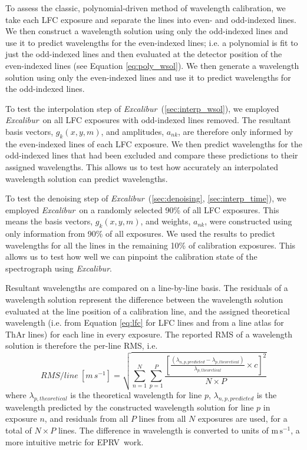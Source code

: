 \documentclass[modern]{aastex63}
\newcommand{\project}[1]{\textsl{#1}}
\newcommand{\name}{\project{Excalibur}}
\newcommand{\acronym}[1]{{\small{#1}}}
\newcommand{\eprv}{\acronym{EPRV}}
\newcommand{\mps}{\mathrm{m\,s^{-1}}}
\begin{document}
To assess the classic, polynomial-driven method of wavelength calibration, we take each LFC exposure and separate the lines into even- and odd-indexed lines.  We then construct a wavelength solution using only the odd-indexed lines and use it to predict wavelengths for the even-indexed lines; i.e. a polynomial is fit to just the odd-indexed lines and then evaluated at the detector position of the even-indexed lines (see Equation \ref{eq:poly_wsol}).  We then generate a wavelength solution using only the even-indexed lines and use it to predict wavelengths for the odd-indexed lines.

To test the interpolation step of \name\ (\textsection \ref{sec:interp_wsol}), we employed \name\ on all LFC exposures with odd-indexed lines removed.  The resultant basis vectors, $g_k(x,y,m)$,  and amplitudes, $a_{nk}$, are therefore only informed by the even-indexed lines of each LFC exposure.  We then predict wavelengths for the odd-indexed lines that had been excluded and compare these predictions to their assigned wavelengths.  This allows us to test how accurately an interpolated wavelength solution can predict wavelengths.

To test the denoising step of \name\ (\textsection \ref{sec:denoising}, \textsection\ref{sec:interp_time}), we employed \name\ on a randomly selected 90\% of all LFC exposures.  This means the basis vectors, $g_k(x,y,m)$,  and weights, $a_{nk}$, were constructed using only information from 90\% of all exposures.  We used the results to predict wavelengths for all the lines in the remaining 10\% of calibration exposures.  This allows us to test how well we can pinpoint the calibration state of the spectrograph using \name.

Resultant wavelengths are compared on a line-by-line basis.  The residuals of a wavelength solution represent the difference between the wavelength solution evaluated at the line position of a calibration line, and the assigned theoretical wavelength (i.e. from Equation \ref{eq:lfc} for LFC lines and from a line atlas for ThAr lines) for each line in every exposure.  The reported RMS of a wavelength solution is therefore the per-line RMS, i.e.
\begin{equation}
RMS/line \: [m\,s^{-1}] = \sqrt{\sum_{n=1}^N\sum_{p=1}^P\frac{[ \frac{(\lambda_{n,p,predicted} - \lambda_{p,theoretical})}{\lambda_{p,theoretical}} \times c ]^2}{N \times P}}
\label{eq:rms}
\end{equation}
where $\lambda_{p,theoretical}$ is the theoretical wavelength for line $p$, $\lambda_{n,p,predicted}$ is the wavelength predicted by the constructed wavelength solution for line $p$ in exposure $n$, and residuals from all $P$ lines from all $N$ exposures are used, for a total of $N \times P$ lines.  The difference in wavelength is converted to units of $\mps$, a more intuitive metric for \eprv\ work.
\end{document}
